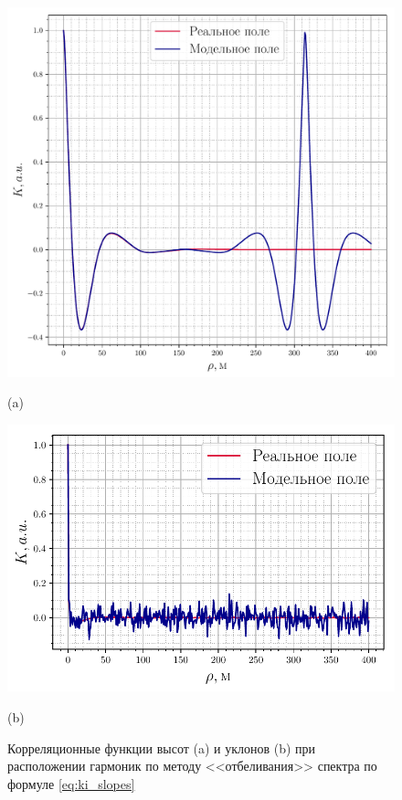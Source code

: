 \documentclass[a4paper,14pt]{extarticle}
\begin{document}
\begin{figure}[h!]
    \centering
    \begin{minipage}{0.49\linewidth}
        \centering
        \includegraphics[width=\linewidth]{fig/correlation_height5_slopes2}

        (a)
    \end{minipage}
    \begin{minipage}{0.49\linewidth}
        \centering
        \includegraphics[width=\linewidth]{fig/correlation_angles_slopes2}

        (b)


    \end{minipage}
    \caption{ Корреляционные функции высот (a) и уклонов (b) при расположении гармоник
    по методу <<отбеливания>> спектра по формуле \eqref{eq:ki_slopes} }
    \label{fig:ki_slopes}
\end{figure}
\end{document}
